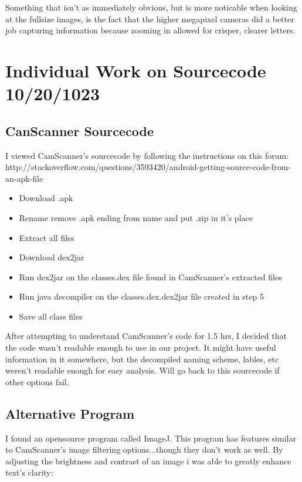\documentclass[]{article}
\begin{document}
			Something that isn't as immediately obvious, but is more noticable when looking at the fullsize images, is the fact that the higher megapixel cameras did a better job capturing information because zooming in allowed for crisper, clearer letters. \\
		
	\section{Individual Work on Sourcecode 10/20/1023}
		
		\subsection{CanScanner Sourcecode}
		I viewed CamScanner's sourcecode by following the instructions on this forum: \\
		http://stackoverflow.com/questions/3593420/android-getting-source-code-from-an-apk-file\\
		
		\begin{itemize}
			\item Download .apk
			\item Rename remove .apk ending from name and put .zip in it's place
			\item Extract all files
			\item Download dex2jar
			\item Run dex2jar on the classes.dex file found in CamScanner's extracted files
			\item Run java decompiler on the classes.dex.dex2jar file created in step 5
			\item Save all class files
		\end{itemize}
		
		After attempting to understand CamScanner's code for 1.5 hrs, I decided that the code wasn't readable enough to use in our project. It might have useful information in it somewhere, but the decompiled naming scheme, lables, etc weren't readable enough for easy analysis. Will go back to this sourcecode if other options fail.
		
		\subsection{Alternative Program}
		
		I found an opensource program called ImageJ. This program has features similar to CamScanner's image filtering options...though they don't work as well. By adjusting the brightness and contrast of an image i was able to greatly enhance text's clarity: \\
		
\end{document}
